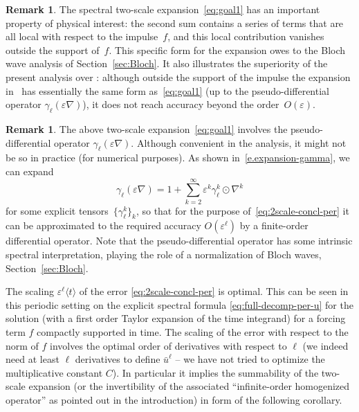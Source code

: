 \documentclass[JEP,XML,SOM,Unicode,published]{cedram}
\theoremstyle{plain}
\theoremstyle{definition}
\newtheorem{rem0}[theor0]{Remark}
\newenvironment{rem}
{\renewcommand{\qedsymbol}{$\lozenge$}\pushQED{\qed}\begin{rem0}}
{\popQED\end{rem0}}
\numberwithin{equation}{section}
\newcommand{\e}{\varepsilon}
\begin{document}
\begin{rem}\label{rem:vanish}
The spectral two-scale expansion~\eqref{eq:goal1} has an important property of physical interest: the second sum contains a series of terms that are all local with respect to the impulse~$f$, and this local contribution vanishes outside the support of~$f$.
This specific form for the expansion owes to the Bloch wave analysis of Section~\ref{sec:Bloch}.
It also illustrates the superiority of the present analysis over \cite{BG}: although outside the support of the impulse the expansion in~\cite{BG} has essentially the same form as~\eqref{eq:goal1} (up to the pseudo-differential operator $\gamma_\ell(\e\nabla)$), it does not reach accuracy beyond {the order}~$O(\e)$.
\end{rem}

\begin{rem}
The above two-scale expansion~\eqref{eq:goal1} involves the pseudo-differential operator $\gamma_\ell(\e \nabla)$. Although convenient in the analysis, it might not be so in practice (\eg for numerical purposes).
As shown in~\eqref{e.expansion-gamma}, we can expand
\[
\gamma_\ell(\e \nabla)=1+\sum_{k=2}^\infty \e^k \gamma_{\ell}^k \odot \nabla^{k}
\]
for some explicit tensors~$\{\gamma_{\ell}^k\}_k$, so that for the purpose of~\eqref{eq:2scale-concl-per} it can be approximated to the required accuracy $O(\e^\ell)$ by a finite-order differential operator. Note that the pseudo-differential operator has some intrinsic spectral interpretation, playing the role of a normalization of Bloch waves, \cf Section~\ref{sec:Bloch}.
\end{rem}

{The scaling $\e^\ell \langle t\rangle$ of the error \eqref{eq:2scale-concl-per} is optimal.
This can be seen in this periodic setting on the explicit spectral formula \eqref{eq:full-decomp-per-u} for the solution (with a first order Taylor expansion of the time integrand) for a forcing term $f$ compactly supported in time. The scaling of the error with respect to the norm of $f$ involves the optimal order of derivatives with respect to $\ell$ (we indeed need at least $\ell$ derivatives to define $\bar u^\ell$ -- we have not tried to optimize the multiplicative constant $C$). In particular it implies the summability of the two-scale expansion (or the invertibility of the associated ``infinite-order homogenized operator'' as pointed out in the introduction) in form of the following corollary.}
\end{document}
